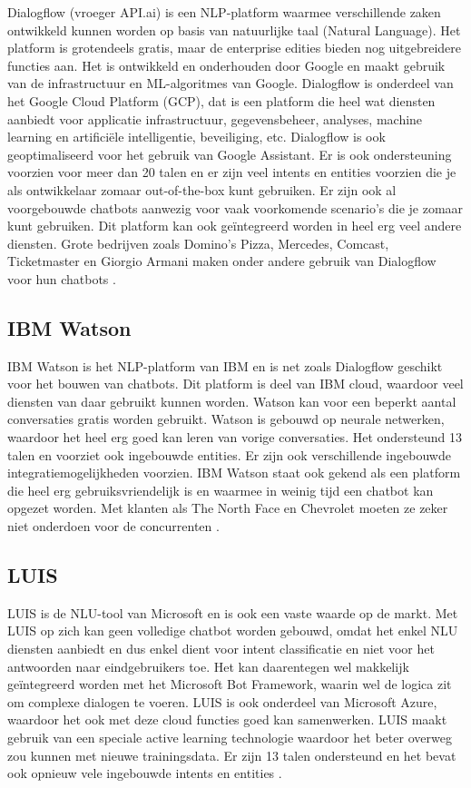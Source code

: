 Dialogflow (vroeger API.ai) is een NLP-platform waarmee verschillende zaken ontwikkeld kunnen worden op basis van natuurlijke taal (Natural Language). Het platform is grotendeels gratis, maar de enterprise edities bieden nog uitgebreidere functies aan. Het is ontwikkeld en onderhouden door Google en maakt gebruik van de infrastructuur en ML-algoritmes van Google. Dialogflow is onderdeel van het Google Cloud Platform (GCP), dat is een platform die heel wat diensten aanbiedt voor applicatie infrastructuur, gegevensbeheer, analyses, machine learning en artificiële intelligentie, beveiliging, etc. Dialogflow is ook geoptimaliseerd voor het gebruik van Google Assistant. Er is ook ondersteuning voorzien voor meer dan 20 talen en er zijn veel intents en entities voorzien die je als ontwikkelaar zomaar out-of-the-box kunt gebruiken. Er zijn ook al voorgebouwde chatbots aanwezig voor vaak voorkomende scenario’s die je zomaar kunt gebruiken. Dit platform kan ook geïntegreerd worden in heel erg veel andere diensten. Grote bedrijven zoals Domino’s Pizza, Mercedes, Comcast, Ticketmaster en Giorgio Armani maken onder andere gebruik van Dialogflow voor hun chatbots \autocite{Dialogflow2020}. 

\subsection{IBM Watson}
\label{subsec:nlp-platformen-ibm-watson}

IBM Watson is het NLP-platform van IBM en is net zoals Dialogflow geschikt voor het bouwen van chatbots. Dit platform is deel van IBM cloud, waardoor veel diensten van daar gebruikt kunnen worden. Watson kan voor een beperkt aantal conversaties gratis worden gebruikt. Watson is gebouwd op neurale netwerken, waardoor het heel erg goed kan leren van vorige conversaties. Het ondersteund 13 talen en voorziet ook ingebouwde entities. Er zijn ook verschillende ingebouwde integratiemogelijkheden voorzien. IBM Watson staat ook gekend als een platform die heel erg gebruiksvriendelijk is en waarmee in weinig tijd een chatbot kan opgezet worden. Met klanten als The North Face en Chevrolet moeten ze zeker niet onderdoen voor de concurrenten \autocite{IBM2020}.


\subsection{LUIS}
\label{subsec:nlp-platformen-luis} 

LUIS is de NLU-tool van Microsoft en is ook een vaste waarde op de markt. Met LUIS op zich kan geen volledige chatbot worden gebouwd, omdat het enkel NLU diensten aanbiedt en dus enkel dient voor intent classificatie en niet voor het antwoorden naar eindgebruikers toe.  Het kan daarentegen wel makkelijk geïntegreerd worden met het Microsoft Bot Framework, waarin wel de logica zit om complexe dialogen te voeren. LUIS is ook onderdeel van Microsoft Azure, waardoor het ook met deze cloud functies goed kan samenwerken. LUIS maakt gebruik van een speciale active learning technologie waardoor het beter overweg zou kunnen met nieuwe trainingsdata. Er zijn 13 talen ondersteund en het bevat ook opnieuw vele ingebouwde intents en entities \autocite{LUIS2020}.

